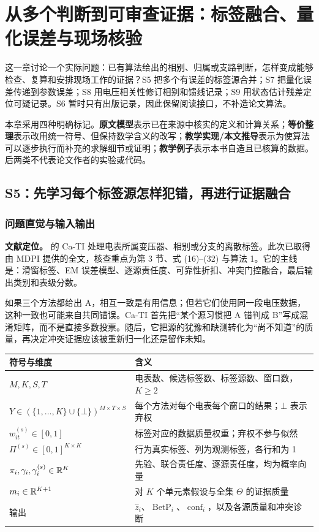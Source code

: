 \chapter{从多个判断到可审查证据：标签融合、量化误差与现场核验}
\label{ch:data_quality}

这一章讨论一个实际问题：已有算法给出的相别、归属或支路判断，怎样变成能够检查、复算和安排现场工作的证据？S5 把多个有误差的标签源合并；S7 把量化误差传递到参数误差；S8 用电压相关性修订相别和馈线记录；S9 用状态估计残差定位可疑记录。S6 暂时只有出版记录，因此保留阅读接口，不补造论文算法。

本章采用四种明确标记。\textbf{原文模型}表示已在来源中核实的定义和计算关系；\textbf{等价整理}表示改用统一符号、但保持数学含义的改写；\textbf{教学实现/本文推导}表示为使算法可以逐步执行而补充的求解细节或证明；\textbf{教学例子}表示本书自造且已核算的数据。后两类不代表论文作者的实验或代码。

\section{S5：先学习每个标签源怎样犯错，再进行证据融合}
\label{sec:dq_s5}

\subsection{问题直觉与输入输出}

\textbf{文献定位。}\citet{S5} 的 Ca-TI 处理电表所属变压器、相别或分支的离散标签。此次已取得由 MDPI 提供的全文，核查重点为第 3 节、式 (16)--(32) 与算法 1。它的主线是：滑窗标签、EM 误差模型、逐源责任度、可靠性折扣、冲突门控融合，最后输出类别和表级分数。

如果三个方法都给出 A，相互一致是有用信息；但若它们使用同一段电压数据，这种一致也可能来自共同错误。Ca-TI 首先把“某个源习惯把 A 错判成 B”写成混淆矩阵，而不是直接多数投票。随后，它把源的犹豫和缺测转化为“尚不知道”的质量，再决定冲突证据应该被重新归一化还是留作未知。

\begin{center}
\begin{tabularx}{\textwidth}{@{}lX@{}}
\toprule
符号与维度 & 含义 \\
\midrule
$M,K,S,T$ & 电表数、候选标签数、标签源数、窗口数，$K\ge2$ \\
$Y\in(\{1,\ldots,K\}\cup\{\bot\})^{M\times T\times S}$ & 每个方法对每个电表每个窗口的结果；$\bot$ 表示弃权 \\
$w_{it}^{(s)}\in[0,1]$ & 标签对应的数据质量权重；弃权不参与似然 \\
$\Pi^{(s)}\in[0,1]^{K\times K}$ & 行为真实标签、列为观测标签，各行和为 1 \\
$\pi_i,\gamma_i,\gamma_i^{(s)}\in\mathbb{R}^K$ & 先验、联合责任度、逐源责任度，均为概率向量 \\
$m_i\in\mathbb{R}^{K+1}$ & 对 $K$ 个单元素假设与全集 $\Theta$ 的证据质量 \\
输出 & $\hat z_i$、$\operatorname{BetP}_i$、$\operatorname{conf}_i$，以及各源质量和冲突诊断 \\
\bottomrule
\end{tabularx}
\end{center}


